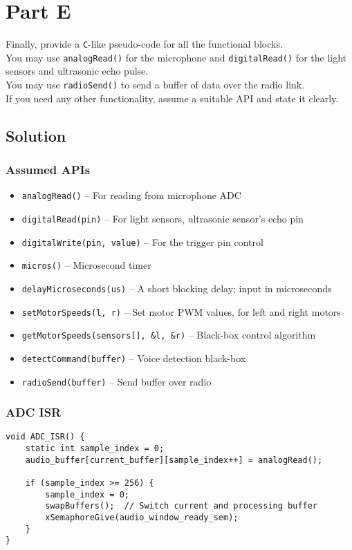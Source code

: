 \section*{Part E}

Finally, provide a \texttt{C}-like pseudo-code for all the functional blocks. \\
You may use \texttt{analogRead\@()} for the microphone and \texttt{digitalRead\@()} for the light sensors and ultrasonic echo pulse. \\
You may use \texttt{radioSend\@()} to send a buffer of data over the radio link. \\
If you need any other functionality, assume a suitable API and state it clearly.

\subsection*{Solution}

\subsubsection*{Assumed APIs}
\begin{itemize}[noitemsep, topsep=0pt]
    \item \texttt{analogRead\@()} – For reading from microphone ADC
    \item \texttt{digitalRead\@(pin)} – For light sensors, ultrasonic sensor's echo pin
    \item \texttt{digitalWrite\@(pin, value)} – For the trigger pin control
    \item \texttt{micros\@()} – Microsecond timer
    \item \texttt{delayMicroseconds\@(us)} – A short blocking delay; input in microseconds
    \item \texttt{setMotorSpeeds\@(l, r)} – Set motor PWM values, for left and right motors
    \item \texttt{getMotorSpeeds\@(sensors[], \&l, \&r)} – Black-box control algorithm
    \item \texttt{detectCommand\@(buffer)} – Voice detection black-box
    \item \texttt{radioSend\@(buffer)} – Send buffer over radio
\end{itemize}

\subsubsection*{ADC ISR}
\begin{verbatim}
void ADC_ISR() {
    static int sample_index = 0;
    audio_buffer[current_buffer][sample_index++] = analogRead();

    if (sample_index >= 256) {
        sample_index = 0;
        swapBuffers();  // Switch current and processing buffer
        xSemaphoreGive(audio_window_ready_sem);
    }
}
\end{verbatim}

